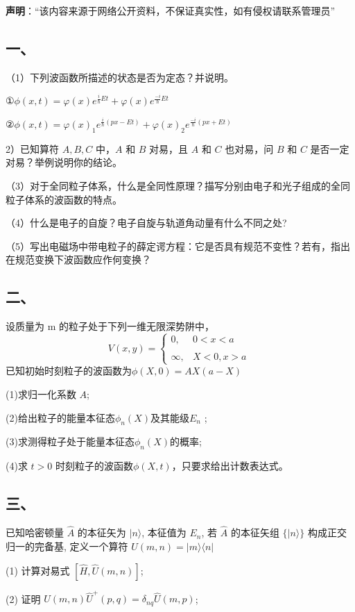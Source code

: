 
\textbf{声明}：“该内容来源于网络公开资料，不保证真实性，如有侵权请联系管理员”

\subsection{一、}
（1）下列波函数所描述的状态是否为定态？并说明。

①$\phi(x,t)=\varphi(x)e^{\frac{i}{\hbar}Et}+\varphi(x)e^{\frac{-i}{\hbar}Et}$

②$\phi(x,t)=\varphi(x)_1e^{\frac{i}{\hbar}(px-Et)}+\varphi(x)_2e^{\frac{-i}{\hbar}(px+Et)}$

2）已知算符 $A,B,C$ 中，$A$ 和 $B$ 对易，且 $A$ 和 $C$ 也对易，问 $B$ 和 $C$ 是否一定对易？举例说明你的结论。

（3）对于全同粒子体系，什么是全同性原理？描写分别由电子和光子组成的全同粒子体系的波函数的特点。

（4）什么是电子的自旋？电子自旋与轨道角动量有什么不同之处?

（5）写出电磁场中带电粒子的薛定谔方程：它是否具有规范不变性？若有，指出在规范变换下波函数应作何变换？
\subsection{二、}
设质量为 m 的粒子处于下列一维无限深势阱中，
$$V(x,y)=\begin{cases}
0,&0 < x <a \\\\
\infty ,& X < 0,  x>a 
\end{cases}~
$$
已知初始时刻粒子的波函数为$\phi(X,0)=AX(a-X)$

(1)求归一化系数 $A$;

(2)给出粒子的能量本征态$\phi_n(X)$及其能级$E_n$ ;

(3)求测得粒子处于能量本征态$\phi_n(X)$的概率;

(4)求 $t>0$ 时刻粒子的波函数$\phi(X,t)$，只要求给出计数表达式。
\subsection{三、}
已知哈密顿量 $\hat{A}$ 的本征矢为 $|n\rangle$, 本征值为 $E_n$, 若 $\hat{A}$ 的本征矢组 $\{|n\rangle\}$ 构成正交归一的完备基, 定义一个算符 $\hat{U}(m,n)=|m\rangle\langle n|$

(1) 计算对易式 $\left[\hat{H}, \hat{U}(m,n)\right]$;

(2) 证明 $\hat{U}(m,n)\hat{U}^+(p,q) = \delta_{nq} \hat{U}(m,p)$;

